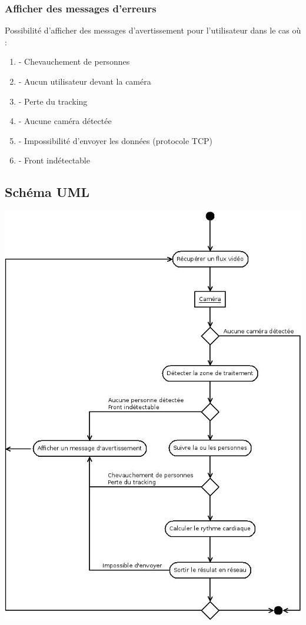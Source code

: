 \documentclass[12pt,a4paper]{article}
\begin{document}
\subsubsection{Afficher des messages d'erreurs}

Possibilité d'afficher des messages d'avertissement pour l'utilisateur dans le cas où :

\begin{enumerate}
\item [] - Chevauchement de personnes
\item [] - Aucun utilisateur devant la caméra
\item [] - Perte du tracking
\item [] - Aucune caméra détectée 
\item [] - Impossibilité d'envoyer les données (protocole TCP)
\item [] - Front indétectable

\end{enumerate}
\newpage
\subsection{Schéma UML}
\includegraphics[scale=0.5]{uml.jpeg}
\newpage
\end{document}
